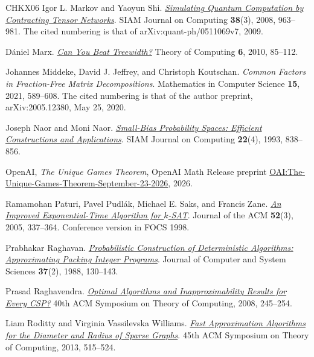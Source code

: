 \documentclass[11pt,reqno]{amsart}
\numberwithin{equation}{section}
\theoremstyle{definition}\newtheorem{definition}[theorem]{Definition}
\theoremstyle{remark}\newtheorem{remark}[theorem]{Remark}
\begin{document}
\begin{thebibliography}{CHKX06}
Igor L. Markov and Yaoyun Shi.
\href{https://doi.org/10.1137/050644756}
{\emph{Simulating Quantum Computation by Contracting Tensor Networks}}.
SIAM Journal on Computing \textbf{38}(3), 2008, 963--981.
The cited numbering is that of arXiv:quant-ph/0511069v7, 2009.

D\'aniel Marx.
\href{https://doi.org/10.4086/toc.2010.v006a005}
{\emph{Can You Beat Treewidth?}}
Theory of Computing \textbf{6}, 2010, 85--112.

Johannes Middeke, David J. Jeffrey, and Christoph Koutschan.
\emph{Common Factors in Fraction-Free Matrix Decompositions}.
Mathematics in Computer Science \textbf{15}, 2021, 589--608.
The cited numbering is that of the author preprint,
arXiv:2005.12380, May 25, 2020.

Joseph Naor and Moni Naor.
\href{https://doi.org/10.1137/0222053}
{\emph{Small-Bias Probability Spaces: Efficient Constructions and Applications}}.
SIAM Journal on Computing \textbf{22}(4), 1993, 838--856.

OpenAI, \emph{The Unique Games Theorem},
OpenAI Math Release preprint
\href{https://github.com/openai/math/blob/main/preprints/The-Unique-Games-Theorem-September-23-2026/paper.pdf}{OAI:The-Unique-Games-Theorem-September-23-2026},
2026.

Ramamohan Paturi, Pavel Pudl\'ak, Michael E. Saks, and Francis Zane.
\href{https://doi.org/10.1145/1066100.1066101}
{\emph{An Improved Exponential-Time Algorithm for $k$-SAT}}.
Journal of the ACM \textbf{52}(3), 2005, 337--364.
Conference version in FOCS 1998.

Prabhakar Raghavan.
\href{https://doi.org/10.1016/0022-0000(88)90003-7}
{\emph{Probabilistic Construction of Deterministic Algorithms:
Approximating Packing Integer Programs}}.
Journal of Computer and System Sciences \textbf{37}(2), 1988, 130--143.

Prasad Raghavendra.
\href{https://doi.org/10.1145/1374376.1374414}
{\emph{Optimal Algorithms and Inapproximability Results for Every CSP?}}
40th ACM Symposium on Theory of Computing, 2008, 245--254.

Liam Roditty and Virginia Vassilevska Williams.
\href{https://doi.org/10.1145/2488608.2488673}
{\emph{Fast Approximation Algorithms for the Diameter and Radius of Sparse Graphs}}.
45th ACM Symposium on Theory of Computing, 2013, 515--524.


\end{thebibliography}
\end{document}
